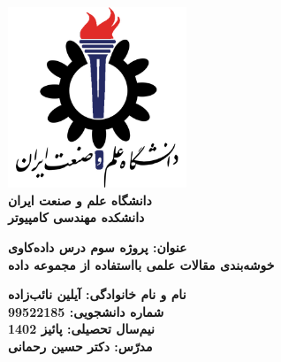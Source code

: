 \begin{titlepage}
\begin{center}
\includegraphics[width=0.4\textwidth]{IUSTLogo.png}\\
        
\LARGE
\textbf{دانشگاه علم و صنعت ایران}\\
\textbf{دانشکده مهندسی کامپیوتر}\\
        
\vfill
        
\huge
\textbf{عنوان: پروژه سوم درس داده‌کاوی}\\
\textbf{خوشه‌بندی مقالات علمی بااستفاده از مجموعه داده }\\
\vfill
        
\LARGE
\textbf{نام و نام خانوادگی: آیلین نائب‌زاده }\\
\textbf{شماره دانشجویی: 99522185}\\
\textbf{نیم‌سال تحصیلی: پائیز 1402}\\
\textbf{مدرّس: دکتر حسین رحمانی}\\
\end{center}
\end{titlepage}
